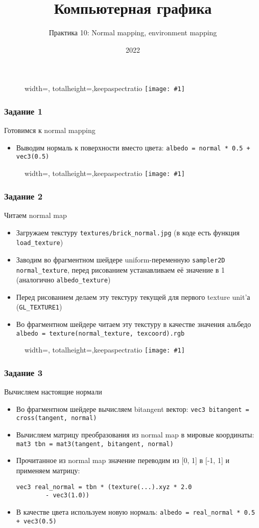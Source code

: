 \documentclass{beamer}
\title{Компьютерная графика}
\subtitle{Практика 10: Normal mapping, environment mapping}
\date{2022}
\newcommand{\slideimage}[1]{
  \begin{figure}
    \begin{adjustbox}{width=\textwidth, totalheight=\textheight-2\baselineskip-2\baselineskip,keepaspectratio}
      \texttt{[image: \#1]}
    \end{adjustbox}
  \end{figure}
}
\begin{document}
\frame{\titlepage}

\begin{frame}[fragile]
\slideimage{0.png}
\end{frame}

\begin{frame}[fragile]
\frametitle{Задание 1}
Готовимся к normal mapping
\begin{itemize}
\item Выводим нормаль к поверхности вместо цвета: \verb|albedo = normal * 0.5 + vec3(0.5)|
\end{itemize}
\end{frame}

\begin{frame}[fragile]
\slideimage{1.png}
\end{frame}

\begin{frame}[fragile]
\frametitle{Задание 2}
Читаем normal map
\begin{itemize}
\item Загружаем текстуру \verb|textures/brick_normal.jpg| (в коде есть функция \verb|load_texture|)
\item Заводим во фрагментном шейдере uniform-переменную \verb|sampler2D normal_texture|, перед рисованием устанавливаем её значение в 1 (аналогично \verb|albedo_texture|)
\item Перед рисованием делаем эту текстуру текущей для первого texture unit'а (\verb|GL_TEXTURE1|)
\item Во фрагментном шейдере читаем эту текстуру в качестве значения альбедо \verb|albedo = texture(normal_texture, texcoord).rgb|
\end{itemize}
\end{frame}

\begin{frame}[fragile]
\slideimage{2.png}
\end{frame}

\begin{frame}[fragile]
\frametitle{Задание 3}
Вычисляем настоящие нормали
\begin{itemize}
\item Во фрагментном шейдере вычисляем bitangent вектор: \verb|vec3 bitangent = cross(tangent, normal)|
\item Вычисляем матрицу преобразования из normal map в мировые координаты: \verb|mat3 tbn = mat3(tangent, bitangent, normal)|
\item Прочитанное из normal map значение переводим из [0, 1] в [-1, 1] и применяем матрицу: \begin{verbatim}vec3 real_normal = tbn * (texture(...).xyz * 2.0
        - vec3(1.0))\end{verbatim}
\item В качестве цвета используем новую нормаль: \verb|albedo = real_normal * 0.5 + vec3(0.5)|
\end{itemize}
\end{frame}
\end{document}
